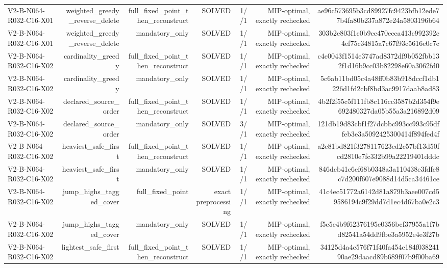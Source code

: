 {\begin{longtable}{lrrrrrr}
V2-B-N064-R032-C16-X01 & weighted\_greedy\_reverse\_delete & full\_fixed\_point\_then\_reconstruct & SOLVED & 1//1 & MIP-optimal, exactly rechecked & ae96c573695b3cd89927fc9423bfb12ede77b4fa80b237a872e24a5803196b64 \\
V2-B-N064-R032-C16-X01 & weighted\_greedy\_reverse\_delete & mandatory\_only & SOLVED & 1//1 & MIP-optimal, exactly rechecked & 303b2e803f1c0b9ce470ecca413c992392c4ef75c34815a7c67f93c5616e0c7c \\
V2-B-N064-R032-C16-X02 & cardinality\_greedy & full\_fixed\_point\_then\_reconstruct & SOLVED & 1//1 & MIP-optimal, exactly rechecked & c4c0043f1514e3747ad8372df9b052fbb132f1d16b9cc03b82298e60a3062fd0 \\
V2-B-N064-R032-C16-X02 & cardinality\_greedy & mandatory\_only & SOLVED & 1//1 & MIP-optimal, exactly rechecked & 5c6ab11bd05c4a48ff0b83b918dccf1db1226d1fd2cbf8bd3ac9917daab8ad83 \\
V2-B-N064-R032-C16-X02 & declared\_source\_order & full\_fixed\_point\_then\_reconstruct & SOLVED & 1//1 & MIP-optimal, exactly rechecked & 4b2f2f55c5f111fb8c116cc3587b2d354f9e692480327da05b55a3a216892d09 \\
V2-B-N064-R032-C16-X02 & declared\_source\_order & mandatory\_only & SOLVED & 3//1 & MIP-optimal, exactly rechecked & 121db19d83cbf1f27dcbbc993cc993c95dffeb3e3a5092425300414f894fed4f \\
V2-B-N064-R032-C16-X02 & heaviest\_safe\_first & full\_fixed\_point\_then\_reconstruct & SOLVED & 1//1 & MIP-optimal, exactly rechecked & a2e81bd821f3278117623ed2c57bf13d50fcd2810e7fc332b99a22219401dddc \\
V2-B-N064-R032-C16-X02 & heaviest\_safe\_first & mandatory\_only & SOLVED & 1//1 & MIP-optimal, exactly rechecked & 846dcb41e6ef68b0348a3a110438e3fdfe8c7d200f607e9088d14d5ca34461ce \\
V2-B-N064-R032-C16-X02 & jump\_highs\_tagged\_cover & full\_fixed\_point & exact preprocessing & 1//1 & MIP-optimal, exactly rechecked & 41c4ec51772a6142d81a879b3aee007cd59586194c9f29dd7d1ec4d67ba0e2c3 \\
V2-B-N064-R032-C16-X02 & jump\_highs\_tagged\_cover & mandatory\_only & SOLVED & 1//1 & MIP-optimal, exactly rechecked & f5e5e4b9f62376195e0356bcf37955a1f7bd82541a54dd9fbe3a5952e4e3f27b \\
V2-B-N064-R032-C16-X02 & lightest\_safe\_first & full\_fixed\_point\_then\_reconstruct & SOLVED & 1//1 & MIP-optimal, exactly rechecked & 34125d4a4c576f71f40fa454e184f03824190ae29daacd89b689f07b9f00ba69 \\

\end{longtable}}
